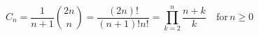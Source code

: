 \[C_n = \frac{1}{n+1} \binom{2n}{n} = \frac{(2n)!}{(n+1)!n!} = \prod_{k=2}^{n} \frac{n+k}{k} \quad \text{for} \, n \geq 0\]